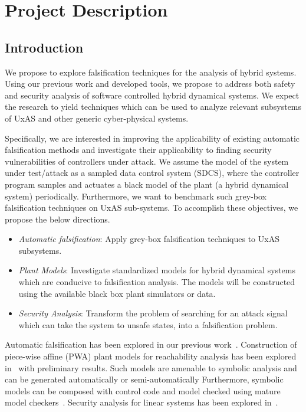 \section{Project Description}

%
%
%

\subsection{Introduction}

We propose to explore falsification techniques for the analysis of
hybrid systems. Using our previous work and developed tools, we
propose to address both safety and security analysis of software
controlled hybrid dynamical systems. We expect the research to yield
techniques which can be used to analyze relevant subsystems of UxAS
and other generic cyber-physical systems.

Specifically, we are interested in improving the applicability of
existing automatic falsification methods and investigate their
applicability to finding security vulnerabilities of controllers under
attack. We assume the model of the system under test/attack as a
sampled data control system (SDCS), where the controller program
samples and actuates a   black model of the plant (a hybrid
dynamical system) periodically. Furthermore, we want to benchmark such
grey-box falsification techniques on UxAS sub-systems. To accomplish
these objectives, we propose the below directions.
\begin{itemize}
    \item \emph{Automatic falsification}: Apply grey-box falsification
        techniques to UxAS subsystems.
    \item \emph{Plant Models}: Investigate standardized models for
        hybrid dynamical systems which are conducive to falsification
        analysis. The models will be constructed using the available
        black box plant simulators or data.
    \item \emph{Security Analysis}:
        Transform the problem of searching for an attack signal which
        can take the system to unsafe states, into a falsification
        problem.
\end{itemize}

Automatic falsification has been explored in our previous
work~\cite{Zutshi+Others/2013/Trajectory, zutshi2014multiple,
zutshi2016symbolic}. Construction of piece-wise affine (PWA) plant
models for reachability analysis has been explored
in~\cite{Zutshi2016} with preliminary results. Such models are
amenable to symbolic analysis and can be generated automatically or
semi-automatically
Furthermore, symbolic models can be composed with
control code and model checked using mature model
checkers~\cite{kroening2014cbmc}. Security analysis for linear systems
has been explored in~\cite{pajic2014robustness, pajic2015attack}.

